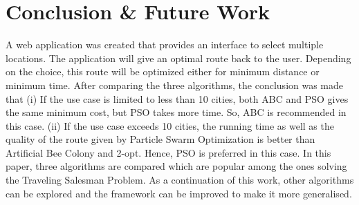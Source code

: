 \documentclass[conference]{IEEEtran}
\begin{document}
\section {Conclusion \& Future Work}
A web application was created that provides an interface to select multiple locations. The application will give an optimal route back to the user. Depending on the choice, this route will be optimized either for minimum distance or minimum time. After comparing the three algorithms, the conclusion was made that (i) If the use case is limited to less than 10 cities, both ABC and PSO gives the same minimum cost, but PSO takes more time. So, ABC is recommended in this case. (ii) If the use case exceeds 10 cities, the running time as well as the quality of the route given by Particle Swarm Optimization is better than Artificial Bee Colony and 2-opt. Hence, PSO is preferred in this case. In this paper, three algorithms are compared which are popular among the ones solving the Traveling Salesman Problem. As a continuation of this work, other algorithms can be explored and the framework can be improved to make it more generalised.
\end{document}
